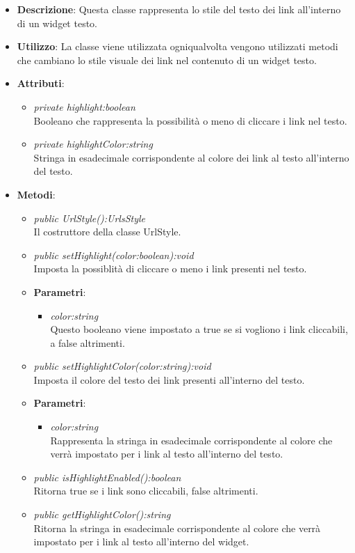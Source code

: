 \begin{itemize}
\item \textbf{Descrizione}: Questa classe rappresenta lo stile del testo dei link all'interno di un widget testo.
\item \textbf{Utilizzo}: La classe viene utilizzata ogniqualvolta vengono utilizzati metodi che cambiano lo stile visuale dei link nel contenuto di un widget testo.
\item \textbf{Attributi}:
	\begin{itemize}
	\item \textit{private highlight:boolean}\\
	Booleano che rappresenta la possibilità o meno di cliccare i link nel testo.
	\item \textit{private highlightColor:string}\\
	Stringa in esadecimale corrispondente al colore dei link al testo all'interno del testo.
	\end{itemize}
\item \textbf{Metodi}:
	\begin{itemize}
	\item \textit{public UrlStyle():UrlsStyle}\\
	Il costruttore della classe UrlStyle.
	\item \textit{public setHighlight(color:boolean):void}\\
	Imposta la possiblità di cliccare o meno i link presenti nel testo.
		\item{\textbf{Parametri}: \begin{itemize}
		\item \textit{color:string}\\
		Questo booleano viene impostato a true se si vogliono i link cliccabili, a false altrimenti.
		\end{itemize}}
	\item \textit{public setHighlightColor(color:string):void}\\
	Imposta il colore del testo dei link presenti all'interno del testo.
		\item{\textbf{Parametri}: \begin{itemize}
		\item \textit{color:string}\\
		Rappresenta la stringa in esadecimale corrispondente al colore che verrà impostato per i link al testo all'interno del testo.
		\end{itemize}}
	\item \textit{public isHighlightEnabled():boolean}\\
	Ritorna true se i link sono cliccabili, false altrimenti.
	\item \textit{public getHighlightColor():string}\\
	Ritorna la stringa in esadecimale corrispondente al colore che verrà impostato per i link al testo all'interno del widget.
	\end{itemize}
\end{itemize}

